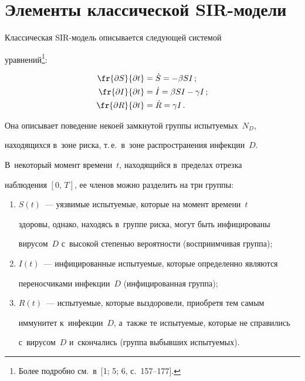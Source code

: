 

  


\section{Элементы классической SIR-модели}







  


  Классическая SIR-модель описывается сле\-ду\-ющей системой 


уравнений\footnote{Более подробно см.\ в~[1; 5; 6, с.~157--177].}:


  \begin{align}


  \fr{\partial S}{\partial t} &= \dot{S}=-\beta S I\,;\label{e1-kor}\\


  \fr{\partial I}{\partial t} &= \dot{I} =\beta S I -\gamma I\,;\label{e2-kor}\\


  \fr{\partial R}{\partial t} &= \dot{R} =\gamma I\,. \label{e3-kor}


  \end{align}


    Она описывает поведение некоей замкнутой группы испытуемых~$N_D$, 


находящихся в~зоне риска, т.\,е.\ в~зоне распространения инфекции~$D$. 


В~некоторый момент времени~$t$, находящийся в~пределах отрезка 


наблюдения $[0,\,T]$, ее членов можно разделить на три группы: 


\begin{enumerate}[(1)]


\item $S(t)$~--- уязвимые испытуемые, которые на момент времени~$t$ 


здоровы, однако, находясь в~группе риска, могут быть инфицированы 


вирусом~$D$ с~высокой степенью ве\-ро\-ят\-ности (восприимчивая группа); 


\item $I(t)$~--- инфицированные испытуемые, которые определенно являются 


переносчиками инфекции~$D$ (инфицированная группа);


\item $R(t)$~--- испытуемые, которые выздоровели, приобретя тем самым 


иммунитет к~инфекции~$D$, а~также те ис\-пы\-ту\-емые, которые не справились 


с~вирусом~$D$ и~скончались (группа выбывших ис\-пы\-ту\-емых).


\end{enumerate}





